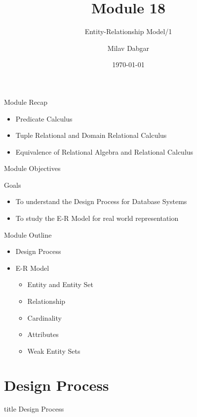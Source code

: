 \documentclass[aspectratio=169, xcolor=dvipsnames]{beamer}
\title{Module 18}
\subtitle{Entity-Relationship Model/1}
\author{Milav Dabgar}
\institute{www.milav.in}
\date{\today}
\begin{document}
\begin{frame}
    \titlepage
\end{frame}

\begin{frame}{Module Recap}
    \begin{itemize}[<+->]
        \item Predicate Calculus
        \item Tuple Relational and Domain Relational Calculus
        \item Equivalence of Relational Algebra and Relational Calculus
    \end{itemize}
\end{frame}

\begin{frame}{Module Objectives}
    \begin{block}{Goals}
        \begin{itemize}[<+->]
            \item To understand the Design Process for Database Systems
            \item To study the E-R Model for real world representation
        \end{itemize}
    \end{block}
\end{frame}

\begin{frame}{Module Outline}
    \begin{itemize}[<+->]
        \item Design Process
        \item E-R Model
        \begin{itemize}
            \item[$\triangleright$] Entity and Entity Set
            \item[$\triangleright$] Relationship
            \item[$\triangleright$] Cardinality
            \item[$\triangleright$] Attributes
            \item[$\triangleright$] Weak Entity Sets
        \end{itemize}
    \end{itemize}
\end{frame}

\section{Design Process}
\begin{frame}
  \vfill
  \centering
  \begin{beamercolorbox}[sep=8pt,center,shadow=true,rounded=true]{title}
    Design Process\par%
  \end{beamercolorbox}
  \vfill
\end{frame}
\end{document}
